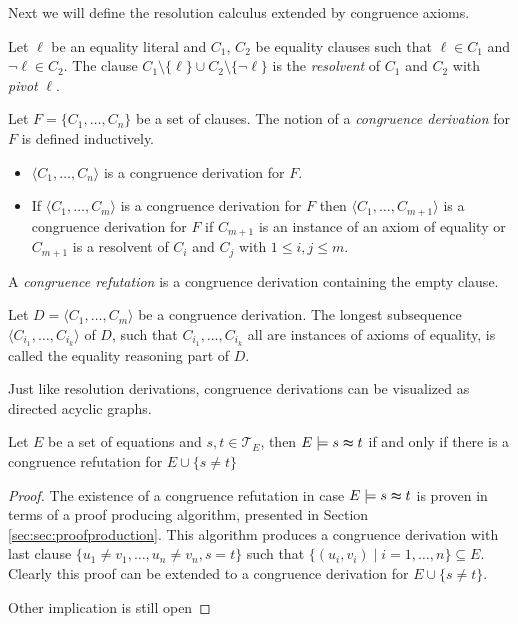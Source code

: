 Next we will define the resolution calculus extended by congruence axioms.

\begin{definition}

Let $\ell$ be an equality literal and $C_1$, $C_2$ be equality clauses such that $\ell \in C_1$ and $\neg \ell \in C_2$.
The clause $C_1 \setminus \{\ell\} \cup C_2 \setminus \{\neg \ell\}$ is the \emph{resolvent} of $C_1$ and $C_2$ with \emph{pivot} $\ell$.

\noindent Let $F = \{C_1, \ldots, C_n\}$ be a set of clauses.
The notion of a \emph{congruence derivation} for $F$ is defined inductively.
\begin{itemize}
	\item $\langle C_1, \ldots, C_n\rangle$ is a congruence derivation for $F$.
	\item If $\langle C_1, \ldots, C_m\rangle$ is a congruence derivation for $F$ then $\langle C_1, \ldots, C_{m+1} \rangle$ is a congruence derivation for $F$ if $C_{m+1}$ is an instance of an axiom of equality or $C_{m+1}$ is a resolvent of $C_i$ and $C_j$ with $1 \leq i,j \leq m$.
\end{itemize}
A \emph{congruence refutation} is a congruence derivation containing the empty clause.

\noindent Let $D = \langle C_1, \ldots, C_m\rangle$ be a congruence derivation.
The longest subsequence $\langle C_{i_1}, \ldots, C_{i_k}\rangle$ of $D$, such that $C_{i_1}, \ldots, C_{i_k}$ all are instances of axioms of equality, is called the equality reasoning part of $D$.

\end{definition}

Just like resolution derivations, congruence derivations can be visualized as directed acyclic graphs.

\begin{proposition}

Let $E$ be a set of equations and $s,t \in \mathcal{T}_E$, then $E \models s \thickapprox t$ if and only if there is a congruence refutation for $E \cup \{ s \neq t\}$

\end{proposition}

\begin{proof}

The existence of a congruence refutation in case $E \models s \thickapprox t$ is proven in terms of a proof producing algorithm, presented in Section \ref{sec:sec:proofproduction}.
This algorithm produces a congruence derivation with last clause $\{u_1 \neq v_1,\ldots,u_n \neq v_n, s = t\}$ such that $\{(u_i,v_i) \mid i = 1,\ldots,n\} \subseteq E$.
Clearly this proof can be extended to a congruence derivation for $E \cup \{ s \neq t\}$.

{\color{blue} Other implication is still open}

\end{proof}
